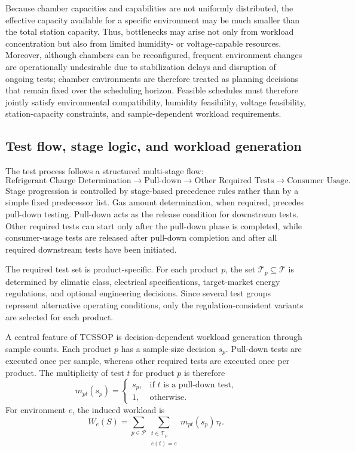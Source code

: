\documentclass[11pt]{article}
\begin{document}
Because chamber capacities and capabilities are not uniformly distributed, the effective capacity available for a specific environment may be much smaller than the total station capacity. Thus, bottlenecks may arise not only from workload concentration but also from limited humidity- or voltage-capable resources. Moreover, although chambers can be reconfigured, frequent environment changes are operationally undesirable due to stabilization delays and disruption of ongoing tests; chamber environments are therefore treated as planning decisions that remain fixed over the scheduling horizon. Feasible schedules must therefore jointly satisfy environmental compatibility, humidity feasibility, voltage feasibility, station-capacity constraints, and sample-dependent workload requirements.

\subsection{Test flow, stage logic, and workload generation}
\label{subsec:test_flow}

The test process follows a structured multi-stage flow:
\[
\text{Refrigerant Charge Determination}\rightarrow \text{Pull-down}\rightarrow \text{Other Required Tests}\rightarrow \text{Consumer Usage}.
\]
Stage progression is controlled by stage-based precedence rules rather than by a simple fixed predecessor list. Gas amount determination, when required, precedes pull-down testing. Pull-down acts as the release condition for downstream tests. Other required tests can start only after the pull-down phase is completed, while consumer-usage tests are released after pull-down completion and after all required downstream tests have been initiated.

The required test set is product-specific. For each product \(p\), the set \(\mathcal{T}_p\subseteq\mathcal{T}\) is determined by climatic class, electrical specifications, target-market energy regulations, and optional engineering decisions. Since several test groups represent alternative operating conditions, only the regulation-consistent variants are selected for each product.

A central feature of TCSSOP is decision-dependent workload generation through sample counts. Each product \(p\) has a sample-size decision \(s_p\). Pull-down tests are executed once per sample, whereas other required tests are executed once per product. The multiplicity of test \(t\) for product \(p\) is therefore
\[
m_{pt}(s_p)=
\begin{cases}
s_p, & \text{if }t\text{ is a pull-down test,}\\
1, & \text{otherwise.}
\end{cases}
\]
For environment \(e\), the induced workload is
\[
W_e(S)=
\sum_{p\in\mathcal{P}}
\sum_{\substack{t\in\mathcal{T}_p\\e(t)=e}}
m_{pt}(s_p)\tau_t .
\]
\end{document}
